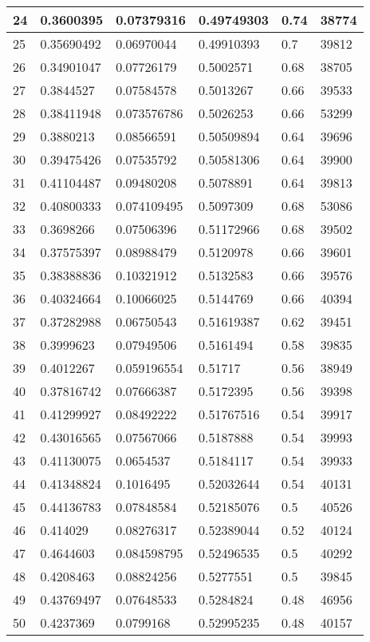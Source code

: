 \begin{longtable}{|l|l|l|l|l|l|}
24 & 0.3600395 & 0.07379316 & 0.49749303 & 0.74 & 38774 \\ \hline 
25 & 0.35690492 & 0.06970044 & 0.49910393 & 0.7 & 39812 \\ \hline 
26 & 0.34901047 & 0.07726179 & 0.5002571 & 0.68 & 38705 \\ \hline 
27 & 0.3844527 & 0.07584578 & 0.5013267 & 0.66 & 39533 \\ \hline 
28 & 0.38411948 & 0.073576786 & 0.5026253 & 0.66 & 53299 \\ \hline 
29 & 0.3880213 & 0.08566591 & 0.50509894 & 0.64 & 39696 \\ \hline 
30 & 0.39475426 & 0.07535792 & 0.50581306 & 0.64 & 39900 \\ \hline 
31 & 0.41104487 & 0.09480208 & 0.5078891 & 0.64 & 39813 \\ \hline 
32 & 0.40800333 & 0.074109495 & 0.5097309 & 0.68 & 53086 \\ \hline 
33 & 0.3698266 & 0.07506396 & 0.51172966 & 0.68 & 39502 \\ \hline 
34 & 0.37575397 & 0.08988479 & 0.5120978 & 0.66 & 39601 \\ \hline 
35 & 0.38388836 & 0.10321912 & 0.5132583 & 0.66 & 39576 \\ \hline 
36 & 0.40324664 & 0.10066025 & 0.5144769 & 0.66 & 40394 \\ \hline 
37 & 0.37282988 & 0.06750543 & 0.51619387 & 0.62 & 39451 \\ \hline 
38 & 0.3999623 & 0.07949506 & 0.5161494 & 0.58 & 39835 \\ \hline 
39 & 0.4012267 & 0.059196554 & 0.51717 & 0.56 & 38949 \\ \hline 
40 & 0.37816742 & 0.07666387 & 0.5172395 & 0.56 & 39398 \\ \hline 
41 & 0.41299927 & 0.08492222 & 0.51767516 & 0.54 & 39917 \\ \hline 
42 & 0.43016565 & 0.07567066 & 0.5187888 & 0.54 & 39993 \\ \hline 
43 & 0.41130075 & 0.0654537 & 0.5184117 & 0.54 & 39933 \\ \hline 
44 & 0.41348824 & 0.1016495 & 0.52032644 & 0.54 & 40131 \\ \hline 
45 & 0.44136783 & 0.07848584 & 0.52185076 & 0.5 & 40526 \\ \hline 
46 & 0.414029 & 0.08276317 & 0.52389044 & 0.52 & 40124 \\ \hline 
47 & 0.4644603 & 0.084598795 & 0.52496535 & 0.5 & 40292 \\ \hline 
48 & 0.4208463 & 0.08824256 & 0.5277551 & 0.5 & 39845 \\ \hline 
49 & 0.43769497 & 0.07648533 & 0.5284824 & 0.48 & 46956 \\ \hline 
50 & 0.4237369 & 0.0799168 & 0.52995235 & 0.48 & 40157 \\ \hline 
\end{longtable}